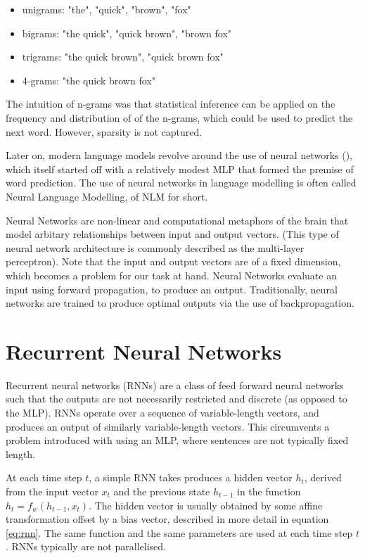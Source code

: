 \documentclass[12pt,twoside]{report}
\begin{document}
\begin{itemize}  
	\item unigrams: "the", "quick", "brown", "fox"
	\item bigrams: "the quick", "quick brown", "brown fox"
	\item trigrams: "the quick brown", "quick brown fox"
	\item 4-grams: "the quick brown fox"
\end{itemize}

The intuition of n-grams was that statistical inference can be applied on the frequency and distribution of of the n-grams, which could be used to predict the next word. However, sparsity is not captured.

Later on, modern language models revolve around the use of neural networks (\cite{bengio_neural_2001}), which itself started off with a relatively modest MLP that formed the premise of word prediction. The use of neural networks in language modelling is often called Neural Language Modelling, of NLM for short.

Neural Networks are non-linear and computational metaphors of the brain that model arbitary relationships between input and output vectors. (This type of neural network architecture is commonly described as the multi-layer perceptron). Note that the input and output vectors are of a fixed dimension, which becomes a problem for our task at hand. Neural Networks evaluate an input using forward propagation, to produce an output. Traditionally, neural networks are trained to produce optimal outputs via the use of backpropagation. 


\section{Recurrent Neural Networks}

Recurrent neural networks (RNNs) are a class of feed forward neural networks such that the outputs are not necessarily restricted and discrete (as opposed to the MLP). RNNs operate over a sequence of variable-length vectors, and produces an output of similarly variable-length vectors. This circumvents a problem introduced with using an MLP, where sentences are not typically fixed length. 

At each time step $t$, a simple RNN takes produces a hidden vector $h_t$, derived from the input vector $x_t$ and the previous state $h_{t-1}$ in the function $h_t = f_w(h_{t-1}, x_t)$. The hidden vector is usually obtained by some affine transformation offset by a bias vector, described in more detail in equation \ref{eq:rnn}. The same function and the same parameters are used at each time step $t$. RNNs typically are not parallelised. 
\end{document}
